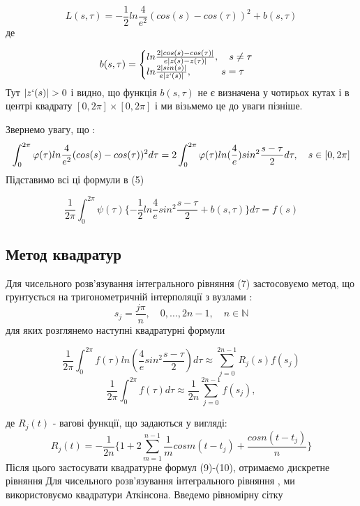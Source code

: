 \documentclass{article}
\begin{document}
\begin{equation*}
L(s,\tau) = -\frac{1}{2}ln \frac{4}{e^2}(cos(s) - cos(\tau))^2 + b(s,\tau)
\end{equation*}
де 

\begin{equation}
b(s,\tau) =\begin{cases}
ln\frac{2|cos(s) - cos(\tau)|}{e|z(s)-z(\tau)|} , \quad s \neq \tau \\
ln\frac{2|sin(s)|}{e|z`(s)|}, \quad \quad \quad s =\tau
\end{cases}
\end{equation}
Тут $|z`(s)| > 0$ і видно, що функція $b(s,\tau)$ не є визначена у чотирьох кутах і в центрі квадрату $[0,2\pi] \times [0,2\pi]$  і ми візьмемо це до уваги пізніше.

Звернемо увагу, що :
\begin{equation*}
\int_0^{2\pi} \varphi(\tau) ln\frac{4}{e^2} (cos(s) - cos(\tau))^2 d\tau = \\ 2 \int_0^{2\pi} \varphi(\tau)ln(\frac{4}{e}) sin^2 \frac{s-\tau}{2} d\tau, \quad s \in [0,2\pi]
\end{equation*}
 Підставимо всі ці формули в (5) 
 
 \begin{equation}
 \frac{1}{2\pi} \int_0^{2\pi} \psi(\tau) \{ -\frac{1}{2} ln\frac{4}{e} sin^2 \frac{s-\tau}{2} + b(s,\tau)\} d\tau = f(s)
 \end{equation}
\subsection{Метод квадратур}

Для чисельного розв'язування інтегрального рівняння (7) застосовуємо метод, що грунтується на тригонометричній інтерполяції з вузлами : 
\begin{equation}
s_j = \frac{j\pi}{n}, \quad 0,\dots,2n-1, \quad n \in \mathbb{N}
\end{equation}
для яких розглянемо наступні квадратурні формули

\begin{equation}
\frac{1}{2\pi} \int_0^{2\pi}f(\tau) ln(\frac{4}{e} sin^2 \frac{s-\tau}{2})d\tau \approx \sum_{j=0}^{2n-1}R_j(s)f(s_j)
\end{equation}
\begin{equation}
\frac{1}{2\pi} \int_0^{2\pi}f(\tau)d\tau \approx \frac{1}{2n}\sum_{j=0}^{2n-1}f(s_j),
\end{equation}

де $R_j(t)$ - вагові функції, що задаються у вигляді:
\begin{equation*}
R_j(t) = -\frac{1}{2n}\{1+2\sum_{m=1}^{n-1} \frac{1}{m} cos m(t - t_j) + \frac{cosn(t-t_j)}{n}\}
\end{equation*}
Після цього застосувати квадратурне формул (9)-(10), отримаємо дискретне рівняння
Для чисельного розв'язування інтегрального рівняння , ми використовуємо квадратури Аткінсона. Введемо рівномірну сітку
\end{document}

